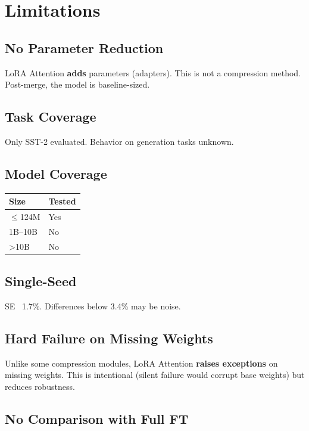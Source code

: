 \section{Limitations}

\subsection{No Parameter Reduction}

LoRA Attention \textbf{adds} parameters (adapters). This is not a compression 
method. Post-merge, the model is baseline-sized.

\subsection{Task Coverage}

Only SST-2 evaluated. Behavior on generation tasks unknown.

\subsection{Model Coverage}

\begin{table}[H]
\centering
\small
\begin{tabular}{ll}
\toprule
\textbf{Size} & \textbf{Tested} \\
\midrule
$\le$124M & Yes \\
1B--10B & No \\
\textgreater{}10B & No \\
\bottomrule
\end{tabular}
\end{table}

\subsection{Single-Seed}

SE ~1.7\%. Differences below 3.4\% may be noise.

\subsection{Hard Failure on Missing Weights}

Unlike some compression modules, LoRA Attention \textbf{raises exceptions} on 
missing weights. This is intentional (silent failure would corrupt base 
weights) but reduces robustness.

\subsection{No Comparison with Full FT}

